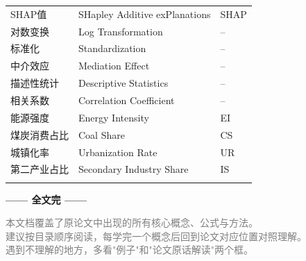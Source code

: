\documentclass[12pt, a4paper]{article}
\begin{document}
\begin{longtable}{lll}
SHAP值 & SHapley Additive exPlanations & SHAP \\
对数变换 & Log Transformation & -- \\
标准化 & Standardization & -- \\
中介效应 & Mediation Effect & -- \\
描述性统计 & Descriptive Statistics & -- \\
相关系数 & Correlation Coefficient & -- \\
能源强度 & Energy Intensity & EI \\
煤炭消费占比 & Coal Share & CS \\
城镇化率 & Urbanization Rate & UR \\
第二产业占比 & Secondary Industry Share & IS \\
\label{tab:terms}
\end{longtable}

\vspace{1cm}
\begin{center}
\Large\textcolor{mainblue}{\textbf{—— 全文完 ——}}
\end{center}

\vspace{0.5cm}
\begin{center}
\small\textcolor{gray}{本文档覆盖了原论文中出现的所有核心概念、公式与方法。\\
建议按目录顺序阅读，每学完一个概念后回到论文对应位置对照理解。\\
遇到不理解的地方，多看"例子"和"论文原话解读"两个框。}
\end{center}
\end{document}
